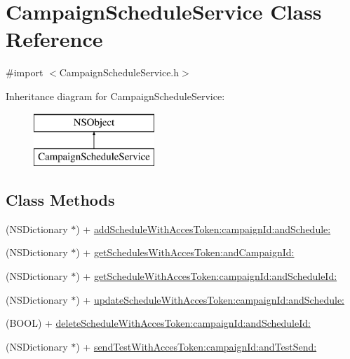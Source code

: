 \hypertarget{interface_campaign_schedule_service}{\section{Campaign\-Schedule\-Service Class Reference}
\label{interface_campaign_schedule_service}
}


{\ttfamily \#import $<$Campaign\-Schedule\-Service.\-h$>$}

Inheritance diagram for Campaign\-Schedule\-Service\-:\begin{figure}[H]
\begin{center}
\leavevmode
\includegraphics[height=2.000000cm]{interface_campaign_schedule_service}
\end{center}
\end{figure}
\subsection*{Class Methods}
\begin{DoxyCompactItemize}
\item 
(N\-S\-Dictionary $\ast$) + \hyperlink{interface_campaign_schedule_service_aab625329df93d892da35fc183f58a794}{add\-Schedule\-With\-Acces\-Token\-:campaign\-Id\-:and\-Schedule\-:}
\item 
(N\-S\-Dictionary $\ast$) + \hyperlink{interface_campaign_schedule_service_a416212ebafc31952a78ab57f3db4e07c}{get\-Schedules\-With\-Acces\-Token\-:and\-Campaign\-Id\-:}
\item 
(N\-S\-Dictionary $\ast$) + \hyperlink{interface_campaign_schedule_service_af9429969c425d5f1c53a7ed77c5c6b5e}{get\-Schedule\-With\-Acces\-Token\-:campaign\-Id\-:and\-Schedule\-Id\-:}
\item 
(N\-S\-Dictionary $\ast$) + \hyperlink{interface_campaign_schedule_service_aaabec0609c81642beca4c3beaf026155}{update\-Schedule\-With\-Acces\-Token\-:campaign\-Id\-:and\-Schedule\-:}
\item 
(B\-O\-O\-L) + \hyperlink{interface_campaign_schedule_service_a5279e0f2dbf8d5dfd4a16f3a0d5ce04b}{delete\-Schedule\-With\-Acces\-Token\-:campaign\-Id\-:and\-Schedule\-Id\-:}
\item 
(N\-S\-Dictionary $\ast$) + \hyperlink{interface_campaign_schedule_service_a0fab6423c51267419688c55ed82d6eb8}{send\-Test\-With\-Acces\-Token\-:campaign\-Id\-:and\-Test\-Send\-:}
\end{DoxyCompactItemize}



